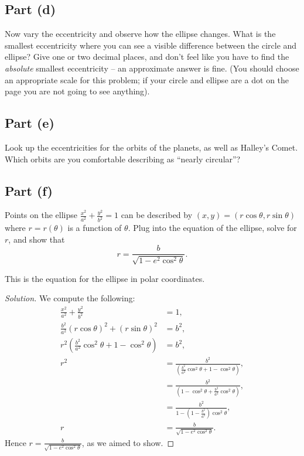 \documentclass[letterpaper, 12pt]{amsart}
\theoremstyle{definition}  %
\begin{document}

		\subsection*{Part (d)}
		Now vary the eccentricity and observe how the ellipse changes. 
		What is the smallest eccentricity where you can see a visible difference between the circle and ellipse? 
		Give one or two decimal places, and don’t feel like you have to find the \textit{absolute} smallest eccentricity -- an approximate answer is fine. 
		(You should choose an appropriate scale for this problem; if your circle and ellipse are a dot on the page you are not going to see anything).

		\subsection*{Part (e)}
		Look up the eccentricities for the orbits of the planets, as well as Halley’s Comet. 
		Which orbits are you comfortable describing as “nearly circular”?

		\subsection*{Part (f)}
		Points on the ellipse $\tfrac{x^{2}}{a^{2}} + \tfrac{y^{2}}{b^{2}} = 1$ can be described by $(x,y) = (r \cos\theta,r\sin\theta)$ where $r = r(\theta)$ is a function of $\theta$. 
		Plug into the equation of the ellipse, solve for $r$, and show that $$r = \frac{b}{\sqrt{1 - e^{2}\cos^{2}\theta}}.$$

		This is the equation for the ellipse in polar coordinates.

		\begin{proof}[Solution]
		We compute the following:
			\begin{align*}
				\frac{x^{2}}{a^{2}} + \frac{y^{2}}{b^{2}} &= 1, \\
				\frac{b^{2}}{a^{2}}(r \cos\theta)^{2} + (r\sin\theta)^{2} &= b^{2}, \\
				r^{2} \left( \frac{b^{2}}{a^{2}}\cos^{2}\theta + 1 - \cos^{2}\theta \right) &= b^{2}, \\
				r^{2} &= \frac{b^{2}}{\left( \tfrac{b^{2}}{a^{2}}\cos^{2}\theta + 1 - \cos^{2}\theta \right)}, \\
				&= \frac{b^{2}}{\left( 1 - \cos^{2}\theta + \tfrac{b^{2}}{a^{2}}\cos^{2}\theta \right)}, \\
				&= \frac{b^{2}}{1 - \left( 1 - \tfrac{b^{2}}{a^{2}} \right)\cos^{2}\theta}, \\
				r &= \frac{b}{\sqrt{1 - e^{2}\cos^{2}\theta}}.
				\end{align*}
		Hence $r = \tfrac{b}{\sqrt{1 - e^{2}\cos^{2}\theta}}$, as we aimed to show.
		\end{proof}
\end{document}
